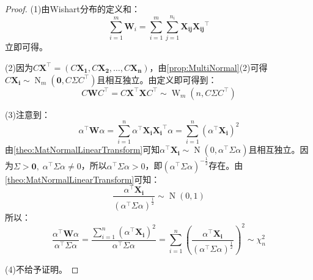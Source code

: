 \begin{proof}
	(1)由Wishart分布的定义和：
	\begin{equation*}
		\sum_{i=1}^{m}\mathbf{W}_i=\sum_{i=1}^{m}\sum_{j=1}^{n_i}\mathbf{X_{ij}}\mathbf{X_{ij}}^{\top}
	\end{equation*}
	立即可得。\par
	(2)因为$C\mathbf{X}^{\top}=(C\mathbf{X_1},C\mathbf{X_2},\dots,C\mathbf{X_n})$，由\cref{prop:MultiNormal}(2)可得$C\mathbf{X_i}\sim\operatorname{N}_m(\mathbf{0},C\Sigma C^{\top})$且相互独立。由定义即可得到：
	\begin{equation*}
		C\mathbf{W}C^{\top}=C\mathbf{X}^{\top}\mathbf{X}C^{\top}\sim\operatorname{W}_m(n,C\Sigma C^{\top})
	\end{equation*}\par
	(3)注意到：
	\begin{equation*}
		\alpha^{\top}\mathbf{W}\alpha=\sum_{i=1}^{n}\alpha^{\top}\mathbf{X_i}\mathbf{X_i}^{\top}\alpha=\sum_{i=1}^{n}(\alpha^{\top}\mathbf{X_i})^2
	\end{equation*}
	由\cref{theo:MatNormalLinearTransform}可知$\alpha^{\top}\mathbf{X_i}\sim\operatorname{N}(0,\alpha^{\top}\Sigma\alpha)$且相互独立。因为$\Sigma>\mathbf{0},\;\alpha^{\top}\Sigma\alpha\ne0$，所以$\alpha^{\top}\Sigma\alpha>0$，即$(\alpha^{\top}\Sigma\alpha)^{-\frac{1}{2}}$存在。由\cref{theo:MatNormalLinearTransform}可知：
	\begin{equation*}
		\frac{\alpha^{\top}\mathbf{X_i}}{(\alpha^{\top}\Sigma\alpha)^{\frac{1}{2}}}\sim\operatorname{N}(0,1)
	\end{equation*}
	所以：
	\begin{equation*}
		\frac{\alpha^{\top}\mathbf{W}\alpha}{\alpha^{\top}\Sigma\alpha}=\frac{\sum\limits_{i=1}^{n}(\alpha^{\top}\mathbf{X_i})^2}{\alpha^{\top}\Sigma\alpha}=\sum_{i=1}^{n}\left(\frac{\alpha^{\top}\mathbf{X_i}}{(\alpha^{\top}\Sigma\alpha)^{\frac{1}{2}}}\right)^2\sim\chi_n^2
	\end{equation*}\par
	(4)不给予证明。
\end{proof}

